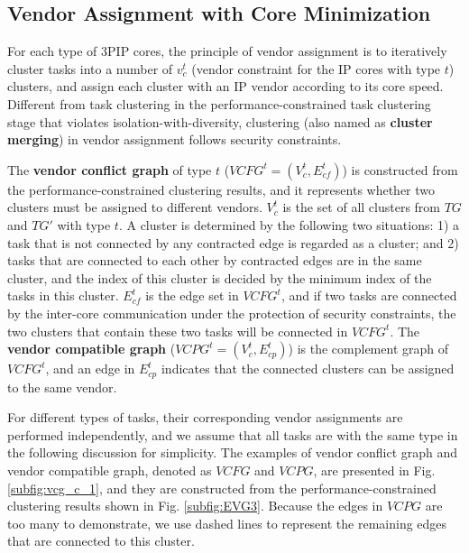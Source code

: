 \documentclass[10pt,journal, compsoc]{IEEEtran}
\begin{document}
\subsection{Vendor Assignment with Core Minimization}


For each type of 3PIP cores, the principle of vendor assignment is to iteratively cluster tasks into a number of $v^t_c$ (vendor constraint for the IP cores with type $t$) clusters, and assign each cluster with an IP vendor according to its core speed. Different from task clustering in the performance-constrained task clustering stage that violates isolation-with-diversity, clustering (also named as \textbf{cluster merging}) in vendor assignment follows security constraints.

The \textbf{vendor conflict graph} of type $t$ ($VCFG^t=(V^t_c, E^t_{cf})$) is constructed from the performance-constrained clustering results, and it represents whether two clusters must be assigned to different vendors. $V^t_c$ is the set of all clusters from $TG$ and $TG'$ with type $t$. A cluster is determined by the following two situations: 1) a task that is not connected by any contracted edge is regarded as a cluster; and 2) tasks that are connected to each other by contracted edges are in the same cluster, and the index of this cluster is decided by the minimum index of the tasks in this cluster. $E^t_{cf}$ is the edge set in $VCFG^t$, and if two tasks are connected by the inter-core communication under the protection of security constraints, the two clusters that contain these two tasks will be connected in $VCFG^t$. The \textbf{vendor compatible graph} ($VCPG^t=(V^t_c, E^t_{cp})$) is the complement graph of $VCFG^t$, and an edge in $E^t_{cp}$ indicates that the connected clusters can be assigned to the same vendor.


For different types of tasks, their corresponding vendor assignments are performed independently, and we assume that all tasks are with the same type in the following discussion for simplicity. The examples of vendor conflict graph and vendor compatible graph, denoted as $VCFG$ and $VCPG$, are presented in Fig. \ref{subfig:vcg_c_1}, and they are constructed from the performance-constrained clustering results shown in Fig. \ref{subfig:EVG3}. Because the edges in $VCPG$ are too many to demonstrate, we use dashed lines to represent the remaining edges that are connected to this cluster.
\end{document}

